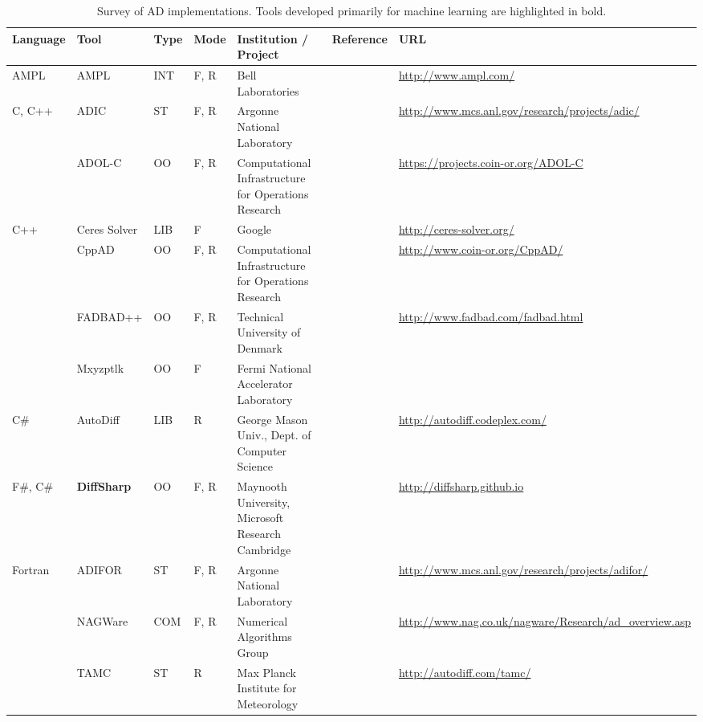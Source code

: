 \documentclass[twoside,11pt]{article}
\begin{document}
\addtolength{\tabcolsep}{-3pt}
\begin{table}
  \centering
  \renewcommand{\arraystretch}{1.5}
  \caption{Survey of AD implementations. Tools developed primarily for machine learning are highlighted in bold.}
  \label{TableADImplementations}
  {\tiny
  \begin{tabularx}{\textwidth}{@{}p{12mm}p{20mm}p{5mm}p{6mm}p{62mm}p{38mm}p{65mm}@{}}
    \toprule
    Language & Tool & Type & Mode & Institution / Project & Reference & URL\\
    \midrule
    AMPL & AMPL & INT & F, R & Bell Laboratories & \citet{Fourer2002} & \tiny\url{http://www.ampl.com/}\\
    C, C++ & ADIC & ST & F, R & Argonne National Laboratory & \citet{Bischof1997} & \tiny\url{http://www.mcs.anl.gov/research/projects/adic/}\\
    & ADOL-C & OO & F, R & Computational Infrastructure for Operations Research & \citet{Walther2012} & \tiny\url{https://projects.coin-or.org/ADOL-C}\\
    C++ & Ceres Solver & LIB & F & Google & & \tiny\url{http://ceres-solver.org/}\\
    & CppAD & OO & F, R & Computational Infrastructure for Operations Research & \citet{Bell2008} & \tiny\url{http://www.coin-or.org/CppAD/}\\
    & FADBAD++ & OO & F, R & Technical University of Denmark & \citet{Bendtsen1996} & \tiny\url{http://www.fadbad.com/fadbad.html}\\
    & Mxyzptlk & OO & F & Fermi National Accelerator Laboratory & \citet{Ostiguy2007} & \\
    C\# & AutoDiff & LIB & R & George Mason Univ., Dept. of Computer Science & \citet{Shtof2013} & \tiny\url{http://autodiff.codeplex.com/}\\
    F\#, C\# & \textbf{DiffSharp} & OO & F, R & Maynooth University, Microsoft Research Cambridge & \citet{baydin2016diffsharp} & \tiny\url{http://diffsharp.github.io}\\
    Fortran & ADIFOR & ST & F, R & Argonne National Laboratory & \citet{Bischof1996} & \tiny\url{http://www.mcs.anl.gov/research/projects/adifor/}\\
    & NAGWare & COM & F, R & Numerical Algorithms Group & \citet{Naumann2005} & \tiny\url{http://www.nag.co.uk/nagware/Research/ad_overview.asp}\\
    & TAMC & ST & R & Max Planck Institute for Meteorology & \citet{Giering1998} & \tiny\url{http://autodiff.com/tamc/}\\

\end{tabularx}}
\end{table}
\end{document}
